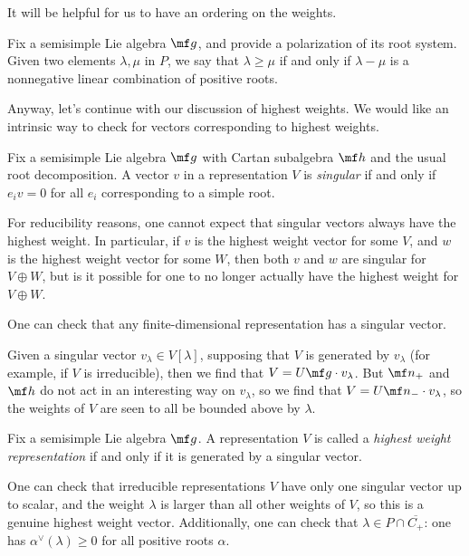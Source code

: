 \documentclass[../notes.tex]{subfiles}
\begin{document}
It will be helpful for us to have an ordering on the weights.
\begin{definition}
	Fix a semisimple Lie algebra $\mf g$, and provide a polarization of its root system. Given two elements $\lambda,\mu$ in $P$, we say that $\lambda\ge\mu$ if and only if $\lambda-\mu$ is a nonnegative linear combination of positive roots.
\end{definition}
Anyway, let's continue with our discussion of highest weights. We would like an intrinsic way to check for vectors corresponding to highest weights.
\begin{definition}[singular]
	Fix a semisimple Lie algebra $\mf g$ with Cartan subalgebra $\mf h$ and the usual root decomposition. A vector $v$ in a representation $V$ is \textit{singular} if and only if $e_iv=0$ for all $e_i$ corresponding to a simple root.
\end{definition}
\begin{remark}
	For reducibility reasons, one cannot expect that singular vectors always have the highest weight. In particular, if $v$ is the highest weight vector for some $V$, and $w$ is the highest weight vector for some $W$, then both $v$ and $w$ are singular for $V\oplus W$, but is it possible for one to no longer actually have the highest weight for $V\oplus W$.
\end{remark}
\begin{remark}
	One can check that any finite-dimensional representation has a singular vector.
\end{remark}
\begin{remark}
	Given a singular vector $v_\lambda\in V[\lambda]$, supposing that $V$ is generated by $v_\lambda$ (for example, if $V$ is irreducible), then we find that $V=U\mf g\cdot v_\lambda$. But $\mf n_+$ and $\mf h$ do not act in an interesting way on $v_\lambda$, so we find that $V=U\mf n_-\cdot v_\lambda$, so the weights of $V$ are seen to all be bounded above by $\lambda$.
\end{remark}
\begin{definition}
	Fix a semisimple Lie algebra $\mf g$. A representation $V$ is called a \textit{highest weight representation} if and only if it is generated by a singular vector.
\end{definition}
\begin{remark}
	One can check that irreducible representations $V$ have only one singular vector up to scalar, and the weight $\lambda$ is larger than all other weights of $V$, so this is a genuine highest weight vector. Additionally, one can check that $\lambda\in P\cap\overline{C_+}$: one has $\alpha^\lor(\lambda)\ge0$ for all positive roots $\alpha$.
\end{remark}
\end{document}
